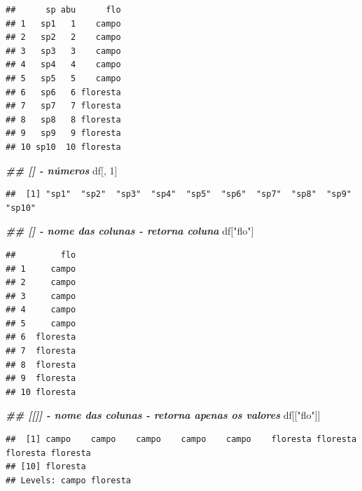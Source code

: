 \documentclass[
]{article}
\newenvironment{Shaded}{\begin{snugshade}}{\end{snugshade}}
\newcommand{\DecValTok}[1]{\textcolor[rgb]{0.00,0.00,0.81}{#1}}
\newcommand{\DocumentationTok}[1]{\textcolor[rgb]{0.56,0.35,0.01}{\textbf{\textit{#1}}}}
\newcommand{\NormalTok}[1]{#1}
\newcommand{\SpecialCharTok}[1]{\textcolor[rgb]{0.81,0.36,0.00}{\textbf{#1}}}
\newcommand{\StringTok}[1]{\textcolor[rgb]{0.31,0.60,0.02}{#1}}
\begin{document}
\begin{verbatim}
##      sp abu      flo
## 1   sp1   1    campo
## 2   sp2   2    campo
## 3   sp3   3    campo
## 4   sp4   4    campo
## 5   sp5   5    campo
## 6   sp6   6 floresta
## 7   sp7   7 floresta
## 8   sp8   8 floresta
## 9   sp9   9 floresta
## 10 sp10  10 floresta
\end{verbatim}

\begin{Shaded}
\begin{Highlighting}[]
\DocumentationTok{\#\# [] {-} números}
\NormalTok{df[, }\DecValTok{1}\NormalTok{]}
\end{Highlighting}
\end{Shaded}

\begin{verbatim}
##  [1] "sp1"  "sp2"  "sp3"  "sp4"  "sp5"  "sp6"  "sp7"  "sp8"  "sp9"  "sp10"
\end{verbatim}

\begin{Shaded}
\begin{Highlighting}[]
\DocumentationTok{\#\# [] {-} nome das colunas {-} retorna coluna}
\NormalTok{df[}\StringTok{"flo"}\NormalTok{]}
\end{Highlighting}
\end{Shaded}

\begin{verbatim}
##         flo
## 1     campo
## 2     campo
## 3     campo
## 4     campo
## 5     campo
## 6  floresta
## 7  floresta
## 8  floresta
## 9  floresta
## 10 floresta
\end{verbatim}

\begin{Shaded}
\begin{Highlighting}[]
\DocumentationTok{\#\# [[]] {-} nome das colunas {-} retorna apenas os valores}
\NormalTok{df[[}\StringTok{"flo"}\NormalTok{]]}
\end{Highlighting}
\end{Shaded}

\begin{verbatim}
##  [1] campo    campo    campo    campo    campo    floresta floresta floresta floresta
## [10] floresta
## Levels: campo floresta
\end{verbatim}

\begin{Shaded}
\end{Shaded}
\end{document}
